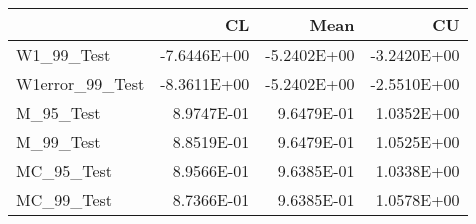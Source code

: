 \begin{tabular}{lrrr}
\toprule
{} &          CL &        Mean &          CU \\
\midrule
W1\_99\_Test      & -7.6446E+00 & -5.2402E+00 & -3.2420E+00 \\
W1error\_99\_Test & -8.3611E+00 & -5.2402E+00 & -2.5510E+00 \\
M\_95\_Test       &  8.9747E-01 &  9.6479E-01 &  1.0352E+00 \\
M\_99\_Test       &  8.8519E-01 &  9.6479E-01 &  1.0525E+00 \\
MC\_95\_Test      &  8.9566E-01 &  9.6385E-01 &  1.0338E+00 \\
MC\_99\_Test      &  8.7366E-01 &  9.6385E-01 &  1.0578E+00 \\
\bottomrule
\end{tabular}
